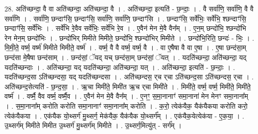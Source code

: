 \documentclass[17pt]{extarticle}
\begin{document}
28. अति॑च्छन्दा॒ वै वा अति॑च्छन्दा॒ अति॑च्छन्दा॒ वै । . अति॑च्छन्दा॒ इत्यति॑ - छ॒न्दाः॒ । . वै सर्वा॑णि॒ सर्वा॑णि॒ वै वै सर्वा॑णि । . सर्वा॑णि॒ छन्दाꣳ॑सि॒ छन्दाꣳ॑सि॒ सर्वा॑णि॒ सर्वा॑णि॒ छन्दाꣳ॑सि । . छन्दाꣳ॑सि॒ सर्वे॑भिः॒ सर्वे॑भि॒ श्छन्दाꣳ॑सि॒ छन्दाꣳ॑सि॒ सर्वे॑भिः । . सर्वे॑भि रे॒वैव सर्वे॑भिः॒ सर्वे॑भि रे॒व । . ए॒वैन॑ मेन मे॒वै वैन᳚म् । . ए॒न॒म् छन्दो॑भि॒ श्छन्दो॑भि रेन मेन॒म् छन्दो॑भिः । . छन्दो॑भिर् मिमीते मिमीते॒ छन्दो॑भि॒ श्छन्दो॑भिर् मिमीते । . छन्दो॑भि॒रिति॒ छन्दः॑ - भिः॒ । . मि॒मी॒ते॒ वर्ष्म॒ वर्ष्म॑ मिमीते मिमीते॒ वर्ष्म॑ । . वर्ष्म॒ वै वै वर्ष्म॒ वर्ष्म॒ वै । . वा ए॒षैषा वै वा ए॒षा । . ए॒षा छन्द॑सा॒म् छन्द॑सा मे॒षैषा छन्द॑साम् । . छन्द॑सां॒ ॅयद् यच् छन्द॑सा॒म् छन्द॑सां॒ ॅयत् । . यदति॑च्छन्दा॒ अति॑च्छन्दा॒ यद् यदति॑च्छन्दाः । . अति॑च्छन्दा॒ यद् यदति॑च्छन्दा॒ अति॑च्छन्दा॒ यत् । . अति॑च्छन्दा॒ इत्यति॑ - छ॒न्दाः॒ । . यदति॑च्छन्द॒सा ऽति॑च्छन्दसा॒ यद् यदति॑च्छन्दसा । . अति॑च्छन्दस॒ र्‌च र्‌चा ऽति॑च्छन्द॒सा ऽति॑च्छन्दस॒ र्‌चा । . अति॑च्छन्द॒सेत्यति॑ - छ॒न्द॒सा॒ । . ऋ॒चा मिमी॑ते॒ मिमी॑त ऋ॒च र्‌चा मिमी॑ते । . मिमी॑ते॒ वर्ष्म॒ वर्ष्म॒ मिमी॑ते॒ मिमी॑ते॒ वर्ष्म॑ । . वर्ष्मै॒ वैव वर्ष्म॒ वर्ष्मै॒व । . ए॒वैन॑ मेन मे॒वै वैन᳚म् । . ए॒नꣳ॒॒ स॒मा॒नानाꣳ॑ समा॒नाना॑ मेन मेनꣳ समा॒नाना᳚म् । . स॒मा॒नाना᳚म् करोति करोति समा॒नानाꣳ॑ समा॒नाना᳚म् करोति । . क॒रो॒ त्येक॑यैक॒ यैक॑यैकया करोति करो॒ त्येक॑यैकया । . एक॑यैक यो॒थ्सर्ग॑ मु॒थ्सर्ग॒ मेक॑यैक॒ यैक॑यैक यो॒थ्सर्ग᳚म् । . एक॑यैक॒येत्येक॑या - ए॒क॒या॒ । . उ॒थ्सर्ग॑म् मिमीते मिमीत उ॒थ्सर्ग॑ मु॒थ्सर्ग॑म् मिमीते । . उ॒थ्सर्ग॒मित्यु॑त् - सर्ग᳚म् । \newline
\end{document}
